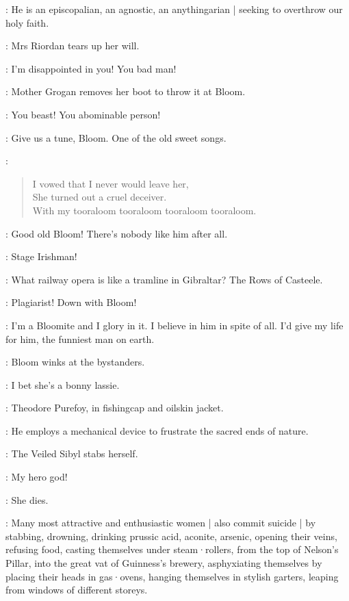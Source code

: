 \FatherFarley[1]:
He is an episcopalian,
an agnostic,
an anythingarian |
seeking to overthrow our holy faith.

:
Mrs Riordan tears up her will.

\MrsRiordan:
I'm disappointed in you!
You bad man!

:
Mother Grogan removes her boot to throw it at Bloom.

\MotherGrogan:
You beast!
You abominable person!

\NoseyFlynn[2]:
Give us a tune,
Bloom.
One of the old sweet songs.

\Bloom:
\begin{verse}
    I vowed that I never would leave her,\\
    She turned out a cruel deceiver.\\
    With my tooraloom tooraloom tooraloom tooraloom.
\end{verse}

\HoppyHolohan[1]:
Good old Bloom!
There's nobody like him after all.

\PaddyLeonard[2]:
Stage Irishman!

\Bloom:
What railway opera is like a tramline in Gibraltar?
The Rows of Casteele.


\Lenehan[1]:
Plagiarist!
Down with Bloom!

\VeiledSibyl[2]:
I'm a Bloomite and I glory in it.
I believe in him in spite of all.
I'd give my life for him,
the funniest man on earth.

:
Bloom winks at the bystanders.

\Bloom:
I bet she's a bonny lassie.

:
Theodore Purefoy,
in fishingcap and oilskin jacket.

\TheodorePurefoy:
He employs a mechanical device to frustrate the sacred ends of nature.

:
The Veiled Sibyl stabs herself.

\VeiledSibyl:
My hero god!

:
She dies.

:
Many most attractive and enthusiastic women |
also commit suicide |
by stabbing,
drowning,
drinking prussic acid,
aconite,
arsenic,
opening their veins,
refusing food,
casting themselves under steam·rollers,
from the top of Nelson's Pillar,
into the great vat of Guinness's brewery,
asphyxiating themselves by placing their heads in gas·ovens,
hanging themselves in stylish garters,
leaping from windows of different storeys.

